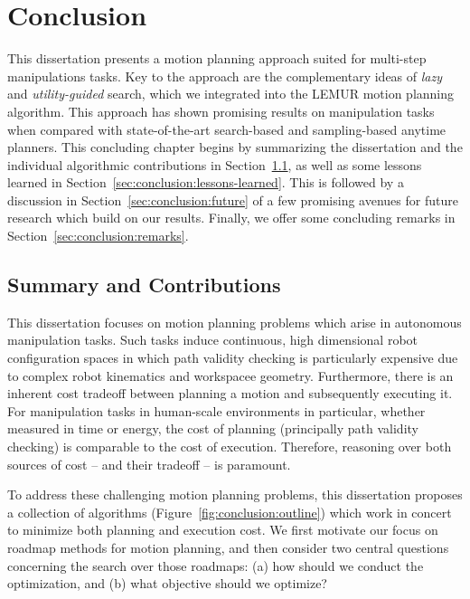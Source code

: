 \chapter{Conclusion}
\label{chap:conclusion}

This dissertation presents a motion planning approach suited for
multi-step manipulations tasks.
Key to the approach are the complementary ideas of \emph{lazy}
and \emph{utility-guided} search,
which we integrated into the LEMUR motion planning algorithm.
This approach has shown promising results on manipulation tasks
when compared with state-of-the-art
search-based and sampling-based anytime planners.
This concluding chapter begins by summarizing the dissertation
and the individual algorithmic contributions
in Section~\ref{sec:conclusion:summary},
as well as some lessons learned
in Section~\ref{sec:conclusion:lessons-learned}.
This is followed by a discussion in Section~\ref{sec:conclusion:future}
of a few promising avenues for future research
which build on our results.
Finally, we offer some concluding remarks
in Section~\ref{sec:conclusion:remarks}.


\section{Summary and Contributions}
\label{sec:conclusion:summary}

This dissertation focuses on motion planning problems
which arise in autonomous manipulation tasks.
Such tasks induce continuous, high dimensional robot configuration
spaces
in which path validity checking is particularly expensive
due to complex robot kinematics and workspacee geometry.
Furthermore,
there is an inherent cost tradeoff between
planning a motion and subsequently executing it.
For manipulation tasks in human-scale environments in particular,
whether measured in time or energy,
the cost of planning (principally path validity checking)
is comparable to the cost of execution.
Therefore,
reasoning over both sources of cost -- and their tradeoff --
is paramount.

To address these challenging motion planning problems,
this dissertation proposes a collection of algorithms
(Figure~\ref{fig:conclusion:outline})
which work in concert to minimize both planning and execution cost.
We first motivate our focus on roadmap methods for motion
planning,
and then consider two central questions concerning the search
over those roadmaps:
(a) how should we conduct the optimization,
and (b) what objective should we optimize?

